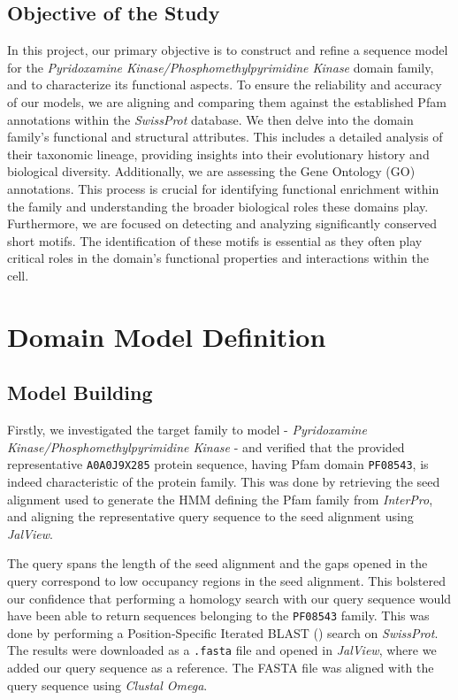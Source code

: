 \documentclass[10pt,twocolumn,letterpaper]{article}
\begin{document}
\subsection{Objective of the Study}

In this project, our primary objective is to construct and refine a sequence model for the \textit{Pyridoxamine Kinase/Phosphomethylpyrimidine Kinase} domain family, and to characterize its functional aspects. To ensure the reliability and accuracy of our models, we are aligning and comparing them against the established Pfam annotations within the \textit{SwissProt} database. We then delve into the domain family's functional and structural attributes. This includes a detailed analysis of their taxonomic lineage, providing insights into their evolutionary history and biological diversity. Additionally, we are assessing the Gene Ontology (GO) annotations. This process is crucial for identifying functional enrichment within the family and understanding the broader biological roles these domains play. Furthermore, we are focused on detecting and analyzing significantly conserved short motifs. The identification of these motifs is essential as they often play critical roles in the domain's functional properties and interactions within the cell.

\section{Domain Model Definition}

\subsection{Model Building}

Firstly, we investigated the target family to model - \textit{Pyridoxamine Kinase/Phosphomethylpyrimidine Kinase} - and verified that the provided representative \texttt{A0A0J9X285}\cite{representative_protein} protein sequence, having Pfam domain \texttt{PF08543}, is indeed characteristic of the protein family. 
This was done by retrieving the seed alignment used to generate the HMM defining the Pfam family from \textit{InterPro}, and aligning the representative query sequence to the seed alignment using \textit{JalView}.

The query spans the length of the seed alignment and the gaps opened in the query correspond to low occupancy regions in the seed alignment. This bolstered our confidence that performing a homology search with our query sequence would have been able to return sequences belonging to the \texttt{PF08543} family. This was done by performing a Position-Specific Iterated BLAST () search on \textit{SwissProt}. The results were downloaded as a \texttt{.fasta} file and opened in \textit{JalView}, where we added our query sequence as a reference. The FASTA file was aligned with the query sequence using \textit{Clustal Omega}.
\end{document}
